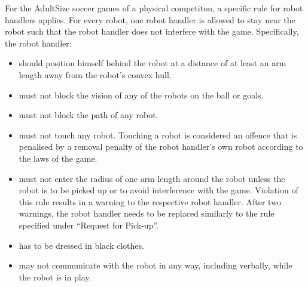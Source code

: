   

  
  \bigskip


\bigskip


\bigskip
For the AdultSize soccer games of a physical competiton, a specific rule for robot handlers applies. For every robot, one robot handler is allowed to stay near the robot such that the robot handler does not interfere with the game. Specifically, the robot handler:
\begin{itemize}
\item should position himself behind the robot at a distance of at least an arm length away from the robot's convex hull.
\item must not block the vision of any of the robots on the ball or goals.
\item must not block the path of any robot.
\item must not touch any robot. Touching a robot is considered an offence that is penalised by a removal penalty of the robot handler's own robot according to the laws of the game.
\item must not enter the radius of one arm length around the robot unless the robot is to be picked up or to avoid interference with the game. Violation of this rule results in a warning to the respective robot handler. After two warnings, the robot handler needs to be replaced similarly to the rule specified under ``Request for Pick-up''.
\item has to be dressed in black clothes.
\item may not communicate with the robot in any way, including verbally, while the robot is in play.
\end{itemize}
\color{black}

